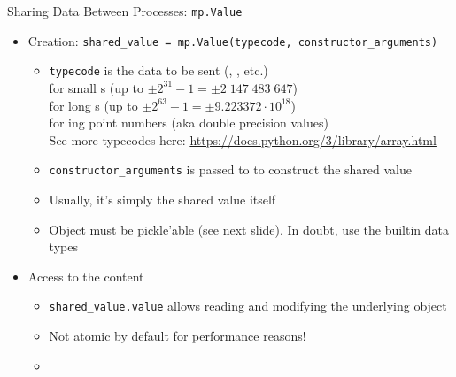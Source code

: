\begin{frame}{Sharing Data Between Processes: \texttt{mp.Value}}
%
\begin{itemize}
\item Creation: \texttt{shared\_value = mp.Value(typecode, constructor\_arguments)}
	\begin{itemize}
	\item \texttt{typecode} is the data to be sent (, , etc.) \\
		 for small s (up to $\pm 2^{31} - 1 = \pm 2\;147\;483\;647$) \\
		 for long s (up to $\pm 2^{63} - 1 = \pm 9.223372 \cdot 10^{18}$) \\
		 for ing point numbers (aka double precision values) \\
		See more typecodes here: \url{https://docs.python.org/3/library/array.html}
	\item \texttt{constructor\_arguments} is passed to  to construct the shared value
	\item Usually, it's simply the shared value itself
	\item Object must be pickle'able (see next slide). In doubt, use the builtin data types
	\end{itemize}
\item Access to the content
	\begin{itemize}
	\item \texttt{shared\_value.value} allows reading and modifying the underlying object
	\item Not atomic by default for performance reasons!
	\item {}
	\end{itemize}
\end{itemize}
%
\end{frame}



